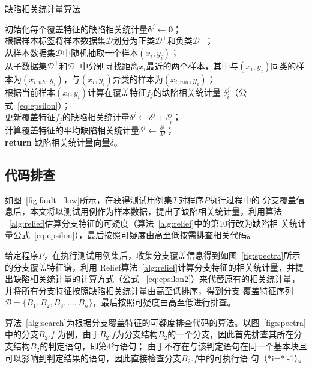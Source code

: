 \begin{algorithm}[H]
\caption{缺陷相关统计量算法}\label{alg:relief}
初始化每个覆盖特征的缺陷相关统计量$\bm \delta^j \leftarrow \bm 0$；\\ 
根据样本标签将样本数据集$\mathcal D$划分为正类$\mathcal D^+$和负类$\mathcal D^-$；\\
 {
     从样本数据集$\mathcal D$中随机抽取一个样本$(x_i,y_i)$；\\
     从子数据集$\mathcal D^+$和$\mathcal D^-$中分别寻找距离$x_i$最近的两个样本，其中与$(x_i,y_i)$同类的样本为$(x_{i,nh},y_i)$，与$(x_i,y_i)$异类的样本为$(x_{i,nm},y_i)$；\\
      {根据当前样本$(x_i,y_i)$计算在覆盖特征$f_j$的缺陷相关统计量
            $\delta^j_i$（公式~\eqref{eq:epsilon}）；\\
            更新覆盖特征$f_j$的缺陷相关统计量$\delta^j \leftarrow \delta^j + \delta^j_i$；\\
     }
}
 {
      计算覆盖特征的平均缺陷相关统计量$\delta^j \leftarrow \frac{\delta^j}{M}$；\\
}
\textbf{return} 缺陷相关统计量向量$\delta$。\\
\end{algorithm}

\subsection{代码排查}\label{code_search}
如图~\ref{fig:fault_flow}所示，在获得测试用例集$\mathcal T$对程序$P$执行过程中的
分支覆盖信息后，本文将以测试用例作为样本数据，提出了缺陷相关统计量，利用算法
~\ref{alg:relief}估算分支特征的可疑度（算法~\ref{alg:relief}中的第10行改为缺陷相
关统计量公式~\eqref{eq:epsilon}），最后按照可疑度由高至低按需排查相关代码。

给定程序$P$，在执行测试用例集后，收集分支覆盖信息得到如图~\ref{fig:spectra}所示的分支覆盖特征谱，利用
Relief算法~\ref{alg:relief}计算分支特征的相关统计量，并提出缺陷相关统计量的计算方式（公式
~\eqref{eq:epsilon2}）来代替原有的相关统计量，并将所有分支特征按照缺陷相关统计量由高至低排序，得到分支
覆盖特征序列$\mathcal B=\{B_1,B_2,B_3,...,B_n\}$，最后按照可疑度由高至低进行排查。

算法~\ref{alg:search}为根据分支覆盖特征的可疑度排查代码的算法。以图~\ref{fig:spectra}中的分支$B_2.f$
为例，由于$B_2.f$为分支结构$B_2$的一个分支，因此首先排查其所在分支结构$B_2$的判定语句，即第4行语句；
由于不存在与该判定语句在同一个基本块且可以影响到判定结果的语句，因此直接检查分支$B_2.f$中的可执行语
句（*i=*i-1）。

